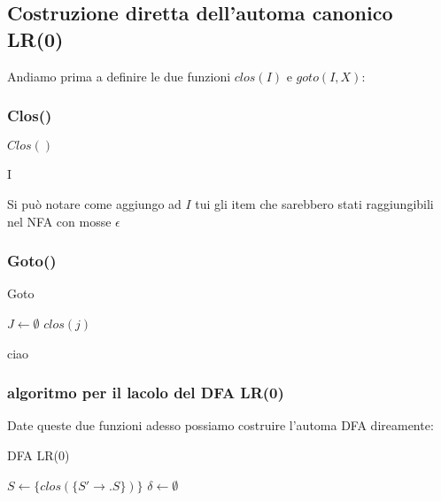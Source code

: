 \subsection{Costruzione diretta dell’automa canonico LR(0)}
Andiamo prima a definire le due funzioni $clos(I)$ e $goto(I,X)$:

\subsubsection{Clos()}
\begin{algorithm}
    \caption{$Clos()$}

    \Return I\;
\end{algorithm}

Si può notare come aggiungo ad $I$  tui gli item che sarebbero stati raggiungibili nel NFA con mosse $\epsilon$
\subsubsection{Goto()}

\begin{algorithm}
    \caption{Goto}

    $J \gets \emptyset$\;
    \Return $clos(j)$ 
\end{algorithm}

ciao


\subsubsection{algoritmo per il lacolo del DFA LR(0)}
Date queste due funzioni adesso possiamo costruire l’automa DFA direamente:

\begin{algorithm}
    \caption{DFA LR(0)}
    $S \gets \{clos(\{S' \to .S\})\}$\;
    $\delta\gets \emptyset$\;
\end{algorithm}



